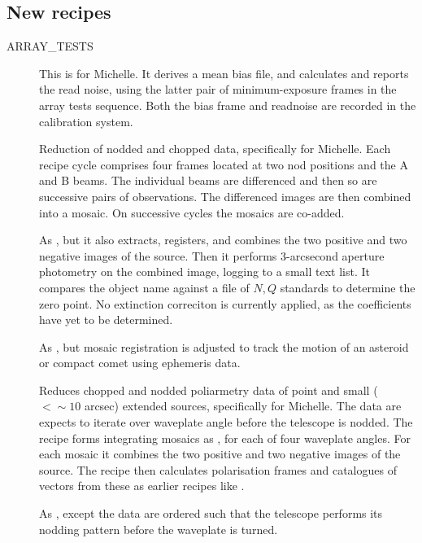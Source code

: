 \documentclass[twoside,11pt,nolof]{starlink}
\begin{document}
\subsection{New recipes}
\begin{description}
   \item [ARRAY\_TESTS]
      This is for Michelle.  It derives a mean bias file, and
      calculates and reports the read noise, using the latter pair of
      minimum-exposure frames in the array tests sequence.  Both the
      bias frame and readnoise are recorded in the calibration system.
   \item []
      Reduction of nodded and chopped data, specifically for Michelle.
      Each recipe cycle comprises four frames located at two nod
      positions and the A and B beams.  The individual beams are
      differenced and then so are successive pairs of observations.
      The differenced images are then combined into a mosaic.  On
      successive cycles the mosaics are co-added.
   \item []
      As , but it also extracts, registers,
      and combines the two positive and two negative images of the
      source. Then it performs 3-arcsecond aperture photometry on the
      combined image, logging to a small text list.  It compares the
      object name against a file of $N,Q$ standards to determine the
      zero point.  No extinction correciton is currently applied, as
      the coefficients have yet to be determined.
   \item []
      As , but mosaic registration
      is adjusted to track the motion of an asteroid or compact comet
      using ephemeris data.
   \item []
      Reduces chopped and nodded poliarmetry data of point and small
      ($<\sim10$ arcsec) extended sources, specifically for Michelle.
      The data are expects to iterate over waveplate angle before the
      telescope is nodded.  The recipe forms integrating mosaics as
      , for each of four waveplate
      angles.  For each mosaic it combines the two positive and two
      negative images of the source.  The recipe then calculates
      polarisation frames and catalogues of vectors from these as
      earlier recipes like .
    \item []
      As ,
      except the data are ordered such that the telescope performs
      its nodding pattern before the waveplate is turned.
\end{description}
\end{document}
